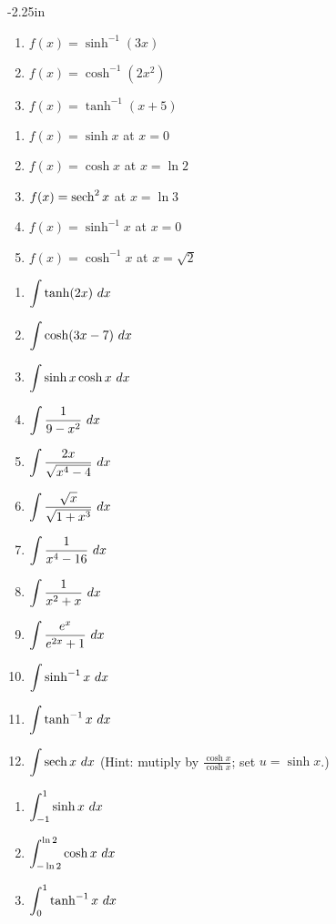 \begin{adjustwidth*}{}{-2.25in}
\begin{multicols*}{2}
\begin{enumerate}[1),resume]
\item $f(x) = \sinh^{-1} (3x)$

\item $f(x) = \cosh^{-1} (2x^2)$

\item $f(x) = \tanh^{-1} (x+5)$
\end{enumerate}


\begin{enumerate}[1),resume]
\item $f(x) = \sinh x$ at $x=0$
\item $f(x) = \cosh x$ at $x=\ln 2$
\item $f(x) = \operatorname{sech}^2 x$ at $x=\ln 3$
\item $f(x) = \sinh^{-1} x$ at $x=0$
\item $f(x) = \cosh^{-1} x$ at $x=\sqrt 2$
\end{enumerate}


\begin{enumerate}[1),resume]
\item $\ds \int \tanh (2x)\ dx$
\item $\ds \int \cosh (3x-7)\ dx$
\item $\ds \int \sinh x\cosh x\ dx$
\item $\ds \int \frac{1}{9-x^2}\ dx$
\item $\ds \int \frac{2x}{\sqrt{x^4-4}}\ dx$
\item $\displaystyle \int \frac{\sqrt{x}}{\sqrt{1+x^3}}\ dx$
\item $\ds \int \frac{1}{x^4-16}\ dx$
\item $\ds \int \frac{1}{x^2+x}\ dx$
\item $\ds \int \frac{e^x}{e^{2x}+1}\ dx$
\item $\ds \int \sinh^{-1}x \ dx$
\item $\ds \int \tanh^{-1}x \ dx$
\item $\displaystyle \int \operatorname{sech} x \ dx$ \quad(Hint: mutiply by $\frac{\cosh x}{\cosh x}$; set $u = \sinh x$.)

\end{enumerate}


\begin{enumerate}[1),resume]
\item $\ds \int_{-1}^1 \sinh x \ dx$
\item $\ds \int_{-\ln 2}^{\ln 2} \cosh x \ dx$
\item $\ds \int_{0}^{1} \tanh^{-1} x \ dx$
\end{enumerate}

\end{multicols*}
\end{adjustwidth*}

\afterexercises